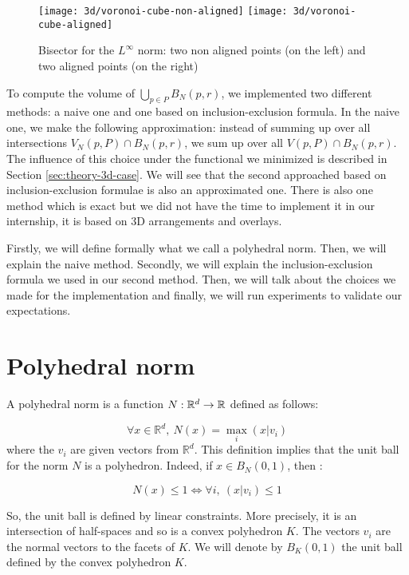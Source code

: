 \begin{figure}[h]
    \centering

    \texttt{[image: 3d/voronoi-cube-non-aligned]}
    \hspace{2cm}
    \texttt{[image: 3d/voronoi-cube-aligned]}
    \caption{Bisector for the $ L^\infty $ norm: two non aligned points (on the
        left) and two aligned points (on the right)}
    \label{fig:3d-voronoi-cube}
\end{figure}

To compute the volume of $ \bigcup_{p \in P} B_N(p, r) $, we implemented two
different methods: a naive one and one based on inclusion-exclusion formula.  In
the naive one, we make the following approximation: instead of summing up over
all intersections $ V_N(p, P) \cap B_N(p, r) $, we sum up over all $ V(p, P)
\cap B_N(p, r) $. The influence of this choice under the functional we minimized
is described in Section \ref{sec:theory-3d-case}. We will see that the second
approached based on inclusion-exclusion formulae is also an approximated one.
There is also one method which is exact but we did not have the time to
implement it in our internship, it is based on 3D arrangements and overlays.

Firstly, we will define formally what we call a polyhedral norm. Then, we will
explain the naive method. Secondly, we will explain the inclusion-exclusion
formula we used in our second method. Then, we will talk about the choices we
made for the implementation and finally, we will run experiments to validate our
expectations.

\section{Polyhedral norm}
\label{sec:polyhedral-norm}
A polyhedral norm is a function $ N : \mathbb{R}^d \to \mathbb{R} $ defined as follows:

\begin{equation}
    \forall x \in \mathbb{R}^d,~ N(x) = \max_{i} (x | v_i)
\end{equation}
where the $ v_i $ are given vectors from $ \mathbb{R}^d $. This definition
implies that the unit ball for the norm $ N $ is a polyhedron. Indeed, if $ x
\in B_N(0, 1) $, then :

$$ N(x) \leq 1 \Longleftrightarrow \forall i,~(x | v_i) \leq 1 $$

So, the unit ball is defined by linear constraints. More precisely, it is an
intersection of half-spaces and so is a convex polyhedron $ K $. The vectors $
v_i $ are the normal vectors to the facets of $ K $. We will denote by $ B_K(0,
1) $ the unit ball defined by the convex polyhedron $ K $.

